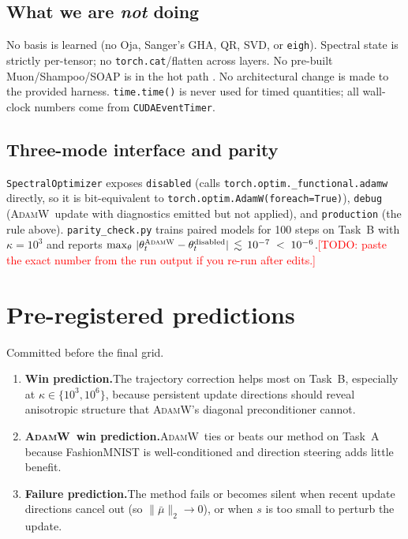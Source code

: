 \documentclass{article}
\newcommand{\todo}[1]{\textcolor{red}{[TODO: #1]}}
\newcommand{\Adamw}{\textsc{AdamW}}
\begin{document}
\subsection{What we are \emph{not} doing}
No basis is learned (no Oja, Sanger's GHA, QR, SVD, or
\texttt{eigh}).  Spectral state is strictly per-tensor; no
\texttt{torch.cat}/flatten across layers.  No pre-built
Muon/Shampoo/SOAP is in the hot path
\citep{gupta2018shampoo,jordan2024muon,vyas2025soap,liu2025muon}.
No architectural change is made to the provided harness.
\texttt{time.time()} is never used for timed quantities; all
wall-clock numbers come from \texttt{CUDAEventTimer}.

\subsection{Three-mode interface and parity}
\texttt{SpectralOptimizer} exposes \texttt{disabled} (calls
\texttt{torch.optim.\_functional.adamw} directly, so it is
bit-equivalent to \texttt{torch.optim.AdamW(foreach=True)}),
\texttt{debug} (\Adamw\ update with diagnostics emitted but not
applied), and \texttt{production} (the rule above).
\texttt{parity\_check.py} trains paired models for 100 steps on
Task~B with $\kappa=10^3$ and reports
$\max_\theta\,|\theta^{\Adamw}_t - \theta^{\text{disabled}}_t|
\,\lesssim\, 10^{-7} \;<\; 10^{-6}$.\todo{paste the exact number from
the run output if you re-run after edits.}

\section{Pre-registered predictions}

Committed before the final grid.

\begin{enumerate}
  \item \textbf{Win prediction.}\quad The trajectory correction helps
        most on Task~B, especially at $\kappa\in\{10^3,10^6\}$,
        because persistent update directions should reveal
        anisotropic structure that \Adamw's diagonal preconditioner
        cannot.
  \item \textbf{\Adamw\ win prediction.}\quad \Adamw\ ties or beats
        our method on Task~A because Fashion\-MNIST is
        well-conditioned and direction steering adds little benefit.
  \item \textbf{Failure prediction.}\quad The method fails or becomes
        silent when recent update directions cancel out (so
        $\|\bar\mu\|_2 \to 0$), or when $s$ is too small to perturb
        the update.
\end{enumerate}
\end{document}
